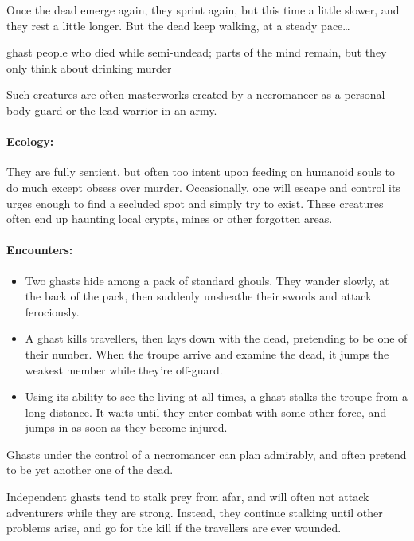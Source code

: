 \begin{multicols}{2}
Once the dead emerge again, they sprint again, but this time a little slower, and they rest a little longer.
But the dead keep walking, at a steady pace\ldots

  {ghast}%
  {people who died while semi-undead; parts of the mind remain, but they only think about drinking murder}%


Such creatures are often masterworks created by a necromancer as a personal body-guard or the lead warrior in an army.


\paragraph{Ecology:} They are fully sentient, but often too intent upon feeding on humanoid souls to do much except obsess over murder.
Occasionally, one will escape and control its urges enough to find a secluded spot and simply try to exist.
These creatures often end up haunting local crypts, mines or other forgotten areas.

\paragraph{Encounters:}

\begin{itemize}

  \item
  Two ghasts hide among a pack of standard ghouls.
  They wander slowly, at the back of the pack, then suddenly unsheathe their swords and attack ferociously.
  \item
  A ghast kills travellers, then lays down with the dead, pretending to be one of their number.
  When the troupe arrive and examine the dead, it jumps the weakest member while they're off-guard.
  \item
  Using its ability to see the living at all times, a ghast stalks the troupe from a long distance.
  It waits until they enter combat with some other force, and jumps in as soon as they become injured.

\end{itemize}

Ghasts under the control of a necromancer can plan admirably, and often pretend to be yet another one of the dead.

Independent ghasts tend to stalk prey from afar, and will often not attack adventurers while they are strong.
Instead, they continue stalking until other problems arise, and go for the kill if the travellers are ever wounded.

\end{multicols}
